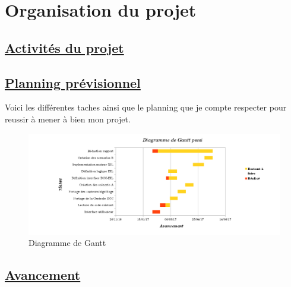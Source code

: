 \section{Organisation du projet}
\label{sec:org_proj}

\subsection{\underline{ Activit\'es du projet}}
\label{sec:activ}




\subsection{\underline{ Planning pr\'evisionnel}}
\label{sec:planning}

  Voici les différentes taches ainsi que le planning que je compte
respecter pour reussir à mener à bien mon projet.


\begin{figure}[ht]
\centering
\includegraphics[scale=0.5]{gantt.png}
\caption{Diagramme de Gantt}
\label{fig5}
\end{figure}

\newpage

\subsection{\underline{ Avancement}}
\label{sec:avanc}


\newpage




